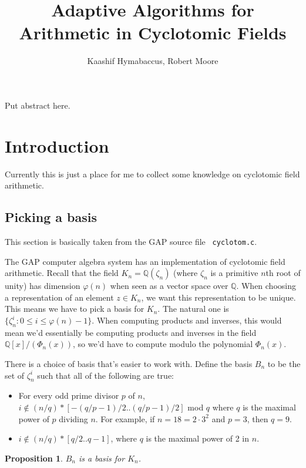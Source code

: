 \documentclass{article}
\title{Adaptive Algorithms for Arithmetic in Cyclotomic Fields}
\author{Kaashif Hymabaccus, Robert Moore}
\newtheorem{prop}{Proposition}
\begin{document}
\maketitle

Put abstract here.

\section{Introduction}

Currently this is just a place for me to collect some knowledge on
cyclotomic field arithmetic.

\subsection{Picking a basis}

This section is basically taken from the GAP source file {\tt
  cyclotom.c}.

The GAP computer algebra system has an implementation of cyclotomic
field arithmetic. Recall that the field $K_n = \mathbb{Q}(\zeta_n)$
(where $\zeta_n$ is a primitive $n$th root of unity) has dimension
$\varphi(n)$ when seen as a vector space over $\mathbb{Q}$. When
choosing a representation of an element $z \in K_n$, we want this
representation to be unique. This means we have to pick a basis for
$K_n$. The natural one is
$\{ \zeta_n^i : 0 \leq i \leq \varphi(n)-1 \}$. When computing
products and inverses, this would mean we'd essentially be computing
products and inverses in the field $\mathbb{Q}[x]/(\Phi_n(x))$, so
we'd have to compute modulo the polynomial $\Phi_n(x)$.

There is a choice of basis that's easier to work with. Define the
basis $B_n$ to be the set of $\zeta_n^i$ such that all of the
following are true:

\begin{itemize}
\item For every odd prime divisor $p$ of $n$,
  $i \notin (n/q)*[-(q/p-1)/2..(q/p-1)/2]$ mod $q$ where $q$ is the
  maximal power of $p$ dividing $n$. For example, if
  $n = 18 = 2 \cdot 3^2$ and $p=3$, then $q=9$.

\item $i \notin (n/q)*[q/2..q-1]$, where $q$ is the maximal power of 2
  in $n$.
\end{itemize}

\begin{prop}
$B_n$ is a basis for $K_n$.
\end{prop}
\end{document}
